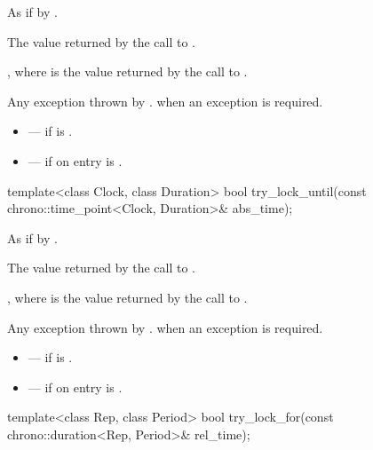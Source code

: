\begin{itemdescr}
\pnum
\effects
As if by .

\pnum
\returns
The value returned by the call to .

\pnum
\ensures
{}, where  is the value returned by
the call to .

\pnum
\throws
Any exception thrown by .
 when an exception is required.

\pnum
\errors
\begin{itemize}
\item {} --- if  is .
\item {} --- if on entry  is
.
\end{itemize}
\end{itemdescr}

%
\begin{itemdecl}
template<class Clock, class Duration>
  bool try_lock_until(const chrono::time_point<Clock, Duration>& abs_time);
\end{itemdecl}

\begin{itemdescr}
\pnum
\effects
As if by .

\pnum
\returns
The value returned by the call to
.

\pnum
\ensures
{}, where  is the value returned by
the call to .

\pnum
\throws
Any exception thrown by .
 when an exception is required.

\pnum
\errors
\begin{itemize}
\item {} --- if  is .
\item {} --- if on entry  is
.
\end{itemize}
\end{itemdescr}

%
\begin{itemdecl}
template<class Rep, class Period>
  bool try_lock_for(const chrono::duration<Rep, Period>& rel_time);
\end{itemdecl}


